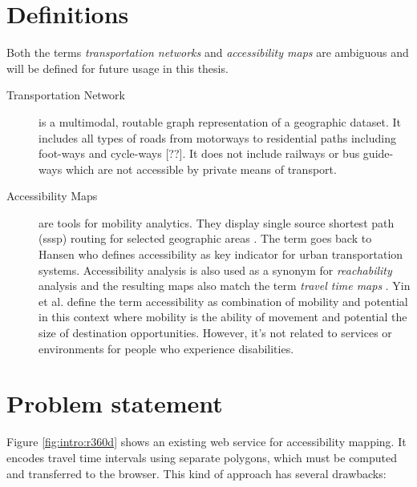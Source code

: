   \section{Definitions}
    \label{sec:intro:def}

    Both the terms \textit{transportation networks} and \textit{accessibility
    maps} are ambiguous and will be defined for future usage in this
    thesis.\par

    \begin{description}
      \item[Transportation Network] is a multimodal, routable graph
        representation of a geographic dataset.
        It includes all types of roads from motorways to residential paths
        including foot-ways and cycle-ways [??]. It does not include railways or
        bus guide-ways which are not accessible by private means of transport.
      \item[Accessibility Maps] are tools for mobility analytics. They display
        single source shortest path (\acrshort{sssp}) routing for selected
        geographic areas \cite{krumke2009graphentheoretische}. The term goes
        back to Hansen \cite{hansen1959accessibility} who defines accessibility
        as key indicator for urban transportation systems.
        Accessibility analysis is also used as a synonym
        for \textit{reachability} analysis \cite{Innerebner2013} and the
        resulting maps also match the term \textit{travel time maps}
        \cite{van2010travel}. Yin et al. \cite{Yin2015} define the
        term accessibility as combination of mobility and potential in this
        context where mobility is the ability of movement and potential the size
        of destination opportunities. However, it's not related to services or
        environments for people who experience disabilities.


    \end{description}

  \section{Problem statement}
    \label{sec:intro:probl}

    Figure \ref{fig:intro:r360d} shows an existing web service for accessibility
    mapping. It encodes travel time intervals using separate polygons, which
    must be computed and transferred to the browser. This kind of approach has
    several drawbacks:\par

